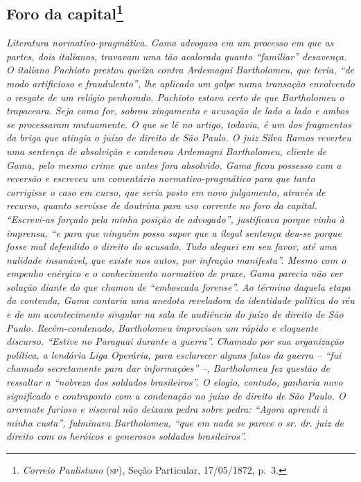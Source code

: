 {\begin{flushright}
\chapter{Foro da capital\footnote{\emph{Correio Paulistano} (\textsc{sp}), Seção Particular,
  17/05/1872, p.~3.}} %

\begin{didascalia}
\emph{Literatura normativo-pragmática. Gama advogava em um processo em
que as partes, dois italianos, travavam uma tão acalorada quanto
``familiar'' desavença. O italiano Pachioto prestou queixa contra
Ardemagni Bartholomeu, que teria, ``de modo artificioso e fraudulento'',
lhe aplicado um golpe numa transação envolvendo o resgate de um relógio
penhorado. Pachioto estava certo de que Bartholomeu o trapaceara. Seja
como for, sobrou xingamento e acusação de lado a lado e ambos se
processaram mutuamente. O que se lê no artigo, todavia, é um dos
fragmentos da briga que atingia o juízo de direito de São Paulo. O juiz
Silva Ramos reverteu uma sentença de absolvição e condenou Ardemagni
Bartholomeu, cliente de Gama, pelo mesmo crime que antes fora absolvido.
Gama ficou possesso com a reversão e escreveu um comentário
normativo-pragmático para que tanto corrigisse o caso em curso, que
seria posto em novo julgamento, através de recurso, quanto servisse de
doutrina para uso corrente no foro da capital. ``Escrevi-as forçado pela
minha posição de advogado'', justificava porque vinha à imprensa, ``e para
que ninguém possa supor que a ilegal sentença deu-se porque fosse mal
defendido o direito do acusado. Tudo aleguei em seu favor, até uma
nulidade insanável, que existe nos autos, por infração manifesta''. Mesmo
com o empenho enérgico e o conhecimento normativo de praxe, Gama parecia
não ver solução diante do que chamou de ``emboscada forense''. Ao término
daquela etapa da contenda, Gama contaria uma anedota reveladora da
identidade política do réu e de um acontecimento singular na sala de
audiência do juízo de direito de São Paulo. Recém-condenado, Bartholomeu
improvisou um rápido e eloquente discurso. ``Estive no Paraguai durante a
guerra''. Chamado por sua organização política, a lendária Liga Operária,
para esclarecer alguns fatos da guerra -- ``fui chamado secretamente para
dar informações'' --, Bartholomeu fez questão de ressaltar a ``nobreza dos
soldados brasileiros''. O elogio, contudo, ganharia novo significado e
contraponto com a condenação no juízo de direito de São Paulo. O
arremate furioso e visceral não deixava pedra sobre pedra: ``Agora
aprendi à minha custa'', fulminava Bartholomeu, ``que em nada se parece o
sr. dr. juiz de direito com os heróicos e generosos soldados
brasileiros''.}
\end{didascalia}


\end{flushright}}
